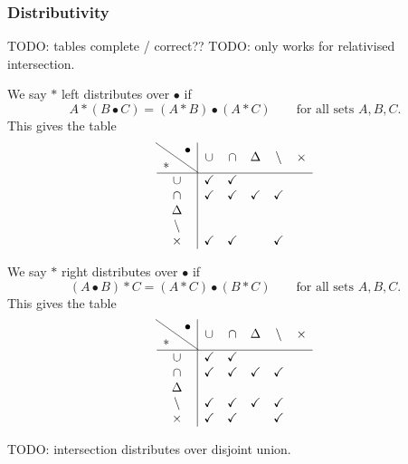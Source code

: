 \subsubsection{Distributivity}
TODO: tables complete / correct?? TODO: only works for relativised intersection.
\begin{lemma}
We say $*$ left distributes over $\bullet$ if
\[ A*(B\bullet C) = (A*B)\bullet (A*C) \qquad\text{for all sets $A,B,C$.} \]
This gives the table
\[ \begin{array}{c | c c c c c}
\text{\diagbox{$*$}{$\bullet$}} & \cup & \cap & \symdiff & \setminus & \times \\ \hline
\cup & \checkmark & \checkmark &  & & \\
\cap & \checkmark & \checkmark & \checkmark & \checkmark & \\
\symdiff &  &  &  & & \\
\setminus &  &  &  & & \\
\times & \checkmark & \checkmark &  & \checkmark &
\end{array} \]
\end{lemma}

\begin{lemma}
We say $*$ right distributes over $\bullet$ if
\[ (A\bullet B)*C = (A*C)\bullet (B*C) \qquad\text{for all sets $A,B,C$.} \]
This gives the table
\[ \begin{array}{c | c c c c c}
\text{\diagbox{$*$}{$\bullet$}} & \cup & \cap & \symdiff & \setminus & \times \\ \hline
\cup & \checkmark & \checkmark &  & & \\
\cap & \checkmark & \checkmark & \checkmark & \checkmark & \\
\symdiff &  &  &  & & \\
\setminus & \checkmark & \checkmark & \checkmark & \checkmark & \\
\times & \checkmark & \checkmark &  & \checkmark &
\end{array} \]
\end{lemma}

TODO: intersection distributes over disjoint union.

